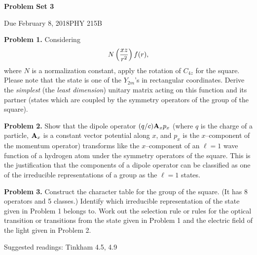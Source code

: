 \documentclass{article}
\newcommand{\Title}     {Problem Set 3}
\newcommand{\DueDate}   {February 8, 2018}
\newcommand{\Course}    {PHY 215B}
\begin{document}
{\huge\bf\Title}

Due \DueDate \hfill \Course

\hrulefill

\textbf{Problem 1.} Considering
\[
    N\left(\dfrac{xz}{r^2}\right)f\vb(r),
\]
where $N$ is a normalization constant, apply the rotation of $C_{4z}$ for the square. Please note that the state is one of the $Y_{2m}$'s in rectangular coordinates. Derive the \textit{simplest} (the \textit{least dimension}) unitary matrix acting on this function and its partner (states which are coupled by the symmetry operators of the group of the square).

\hrulefill

\textbf{Problem 2.} Show that the dipole operator $(q/c)\vb{A}_x p_x$ (where $q$ is the charge of a particle, $\vb{A}_x$ is a constant vector potential along $x$, and $p_x$ is the $x$--component of the momentum operator) transforms like the $x$--component of an $\ell = 1$ wave function of a hydrogen atom under the symmetry operators of the square. This is the justification that the components of a dipole operator can be classified as one of the irreducible representations of a group as the $\ell = 1$ states.

\hrulefill

\textbf{Problem 3.} Construct the character table for the group of the square. (It has 8 operators and 5 classes.) Identify which irreducible representation of the state given in Problem 1 belongs to. Work out the selection rule or rules for the optical transition or transitions from the state given in Problem 1 and the electric field of the light given in Problem 2.

\vfill
Suggested readings: Tinkham 4.5, 4.9 
\end{document}
